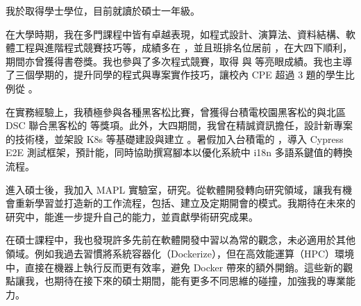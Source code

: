 我於\chineseBachelorUniversity\chineseBachelorDeparment 取得學士學位，目前就讀於\chineseMasterUniversity\chineseMasterInstitute 碩士一年級。

在大學時期，我在多門課程中皆有卓越表現，如程式設計、演算法、資料結構、軟體工程與進階程式競賽技巧等，成績多在 ，並且班排名位居前 ，在大四下順利，期間亦曾獲得書卷獎。我也參與了多次程式競賽，取得 與 等亮眼成績。我也主導了三個學期的，提升同學的程式與專案實作技巧，讓校內 CPE 超過 3 題的學生比例從 。

在實務經驗上，我積極參與各種黑客松比賽，曾獲得台積電校園黑客松的與北區 DSC 聯合黑客松的 等獎項。此外，大四期間，我曾在精誠資訊擔任，設計新專案的技術棧，並架設 K8s 等基礎建設與建立 。暑假加入台積電的 ，導入 Cypress E2E 測試框架，預計能，同時協助撰寫腳本以優化系統中 i18n 多語系鍵值的轉換流程。

進入碩士後，我加入 MAPL 實驗室，研究。從軟體開發轉向研究領域，讓我有機會重新學習並打造新的工作流程，包括、建立及定期開會的模式。我期待在未來的研究中，能進一步提升自己的能力，並貢獻學術研究成果。

在碩士課程中，我也發現許多先前在軟體開發中習以為常的觀念，未必適用於其他領域。例如我過去習慣將系統容器化（Dockerize），但在高效能運算（HPC）環境中，直接在機器上執行反而更有效率，避免 Docker 帶來的額外開銷。這些新的觀點讓我，也期待在接下來的碩士期間，能有更多不同思維的碰撞，加強我的專業能力。
